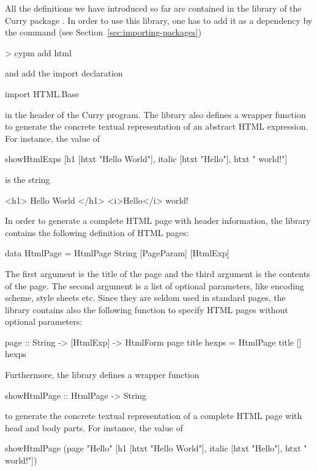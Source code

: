 %
All the definitions we have introduced so far are contained
in the library 
of the Curry package .
In order to use this library, one has to add it as a dependency
by the \cpm command (see Section~\ref{sec:importing-packages})
%
\begin{curry}
> cypm add html
\end{curry}
%
and add the import declaration
\begin{curry}
import HTML.Base
\end{curry}
in the header of the Curry program.
The library  also defines a wrapper function
 to generate the concrete textual
representation of an abstract HTML expression. For instance, the value of
%
\begin{curry}
showHtmlExps [h1 [htxt "Hello World"], italic [htxt "Hello"], htxt " world!"]
\end{curry}
%
is the string
%
\begin{curry}
<h1>
  Hello World
</h1>
<i>Hello</i> world!
\end{curry}
%
In order to generate a complete HTML page with header information,
the  library contains the following definition of HTML pages:
\begin{curry}
data HtmlPage = HtmlPage String [PageParam] [HtmlExp] 
\end{curry}
The first argument is the title of the page
and the third argument is the contents of the page.
The second argument is a list of optional parameters,
like encoding scheme, style sheets etc.
Since they are seldom used in standard pages,
the  library contains also the following function
to specify HTML pages without optional parameters:
\begin{curry}
page :: String -> [HtmlExp] -> HtmlForm
page title hexps = HtmlPage title [] hexps
\end{curry}
%
Furthermore, the  library defines a wrapper function
\begin{curry}
showHtmlPage :: HtmlPage -> String
\end{curry}
to generate the concrete textual
representation of a complete HTML page with head and body parts.
For instance, the value of
%
\begin{curry}
showHtmlPage (page "Hello" [h1 [htxt "Hello World"],
                            italic [htxt "Hello"], htxt " world!"])
\end{curry}
